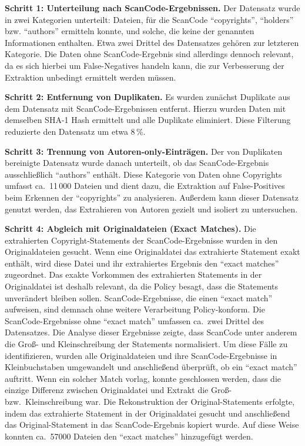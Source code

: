 \textbf{Schritt 1: Unterteilung nach ScanCode-Ergebnissen.}
Der Datensatz wurde in zwei Kategorien unterteilt: Dateien, für die ScanCode \enquote{copyrights}, \enquote{holders} bzw. \enquote{authors} ermitteln konnte, und solche, die keine der genannten Informationen enthalten.
Etwa zwei Drittel des Datensatzes gehören zur letzteren Kategorie.
Die Daten ohne ScanCode-Ergebnis sind allerdings dennoch relevant, da es sich hierbei um False-Negatives handeln kann, die zur Verbesserung der Extraktion unbedingt ermittelt werden müssen.

\textbf{Schritt 2: Entfernung von Duplikaten.}
Es wurden zunächst Duplikate aus dem Datensatz mit ScanCode-Ergebnissen entfernt.
Hierzu wurden Daten mit demselben SHA-1 Hash ermittelt und alle Duplikate eliminiert.
Diese Filterung reduzierte den Datensatz um etwa 8\,\%.

\textbf{Schritt 3: Trennung von Autoren-only-Einträgen.}
Der von Duplikaten bereinigte Datensatz wurde danach unterteilt, ob das ScanCode-Ergebnis ausschließlich \enquote{authors} enthält.
Diese Kategorie von Daten ohne Copyrights umfasst ca.\ 11\,000 Dateien und dient dazu, die Extraktion auf False-Positives beim Erkennen der \enquote{copyrights} zu analysieren.
Außerdem kann dieser Datensatz genutzt werden, das Extrahieren von Autoren gezielt und isoliert zu untersuchen.

\textbf{Schritt 4: Abgleich mit Originaldateien (Exact Matches).}
Die extrahierten Copyright-Statements der ScanCode-Ergebnisse wurden in den Originaldateien gesucht.
Wenn eine Originaldatei das extrahierte Statement exakt enthält, wird diese Datei und ihr extrahiertes Ergebnis den \enquote{exact matches} zugeordnet.
Das exakte Vorkommen des extrahierten Statements in der Originaldatei ist deshalb relevant, da die Policy besagt, dass die Statements unverändert bleiben sollen.
ScanCode-Ergebnisse, die einen \enquote{exact match} aufweisen, sind demnach ohne weitere Verarbeitung Policy-konform.
Die ScanCode-Ergebnisse ohne \enquote{exact match} umfassen ca.\ zwei Drittel des Datensatzes.
Die Analyse dieser Ergebnisse zeigte, dass ScanCode unter anderem die Groß- und Kleinschreibung der Statements normalisiert.
Um diese Fälle zu identifizieren, wurden alle Originaldateien und ihre ScanCode-Ergebnisse in Kleinbuchstaben umgewandelt und anschließend überprüft, ob ein \enquote{exact match} auftritt.
Wenn ein solcher Match vorlag, konnte geschlossen werden, dass die einzige Differenz zwischen Originaldatei und Extrakt die Groß- bzw.\ Kleinschreibung war.
Die Rekonstruktion der Original-Statements erfolgte, indem das extrahierte Statement in der Originaldatei gesucht und anschließend das Original-Statement in das ScanCode-Ergebnis kopiert wurde.
Auf diese Weise konnten ca.\ \num{57000} Dateien den \enquote{exact matches} hinzugefügt werden.

